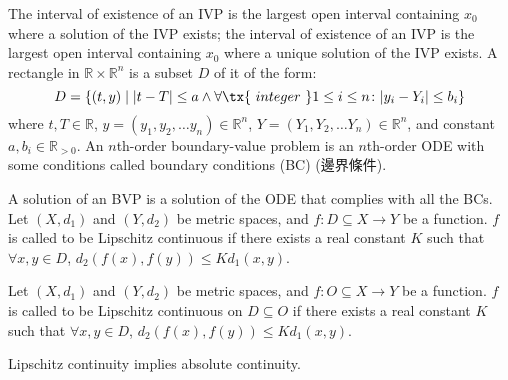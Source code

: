 \documentclass[a4paper,12pt]{report}
\begin{document}
\begin{itemize}
\begin{itemize}
The interval of existence of an IVP is the largest open interval containing $x_0$ where a solution of the IVP exists; the interval of existence of an IVP is the largest open interval containing $x_0$ where a unique solution of the IVP exists.
A rectangle in $\mathbb{R}\times\mathbb{R}^n$ is a subset $D$ of it of the form:
\[D=\{(t,y)\mid|t-T|\leq a\land\forall\tx{\ integer\ }1\leq i\leq n\colon |y_i-Y_i|\leq b_i\}\]
where $t,T\in\mathbb{R}$, $y=(y_1, y_2,\dots  y_n)\in\mathbb{R}^n$, $Y=(Y_1, Y_2,\dots  Y_n)\in\mathbb{R}^n$, and constant $a,b_i\in\mathbb{R}_{>0}$.
An $n$th-order boundary-value problem is an $n$th-order ODE with some conditions called boundary conditions (BC) (邊界條件).

A solution of an BVP is a solution of the ODE that complies with all the BCs.
Let $(X,d_1)$ and $(Y,d_2)$ be metric spaces, and $f\colon D\subseteq X\to Y$ be a function. $f$ is called to be Lipschitz continuous if there exists a real constant $K$ such that $\forall x,y\in D$, $d_{2}(f(x),f(y))\leq Kd_{1}(x,y)$.

Let $(X,d_1)$ and $(Y,d_2)$ be metric spaces, and $f\colon O\subseteq X\to Y$ be a function. $f$ is called to be Lipschitz continuous on $D\subseteq O$ if there exists a real constant $K$ such that $\forall x,y\in D$, $d_{2}(f(x),f(y))\leq Kd_{1}(x,y)$.

Lipschitz continuity implies absolute continuity.


\end{itemize}
\end{itemize}
\end{document}
